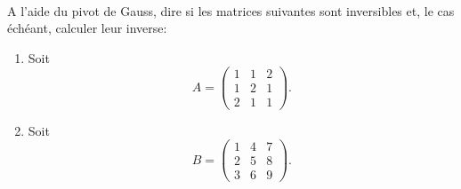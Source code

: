 \begin{td-exo} \,\\%
	A l'aide du pivot de Gauss, dire si les matrices suivantes sont inversibles et,
	le cas échéant, calculer leur inverse:
	\begin{enumerate}
		\item Soit
		\begin{equation*}
			A = 
			\begin{pmatrix}
				1 & 1 & 2\\
				1 & 2 & 1\\
				2 & 1 & 1
			\end{pmatrix}.
		\end{equation*}

		\item Soit
		\begin{equation*}
			B = 
			\begin{pmatrix}
				1 & 4 & 7\\
				2 & 5 & 8\\
				3 & 6 & 9
			\end{pmatrix}.
		\end{equation*}
	\end{enumerate}
\end{td-exo}

